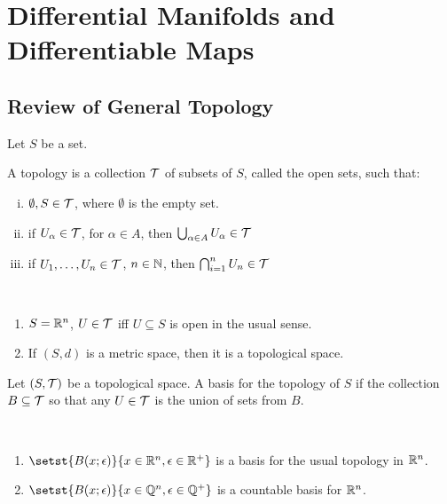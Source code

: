 
\section{Differential Manifolds and Differentiable Maps}
\label{Section1}

\subsection{Review of General Topology}

Let $S$ be a set.

\begin{definition}
	A topology is a collection $\mathcal{T}$ of subsets of $S$, called the open sets, such that:
	\begin{enumerate}[(i)]
		\item $\emptyset, S \in \mathcal{T}$, where $\emptyset$ is the empty set.
		\item if $U_\alpha \in \mathcal{T}$, for $\alpha\in A$, then $\bigcup_{\alpha\in A} U_\alpha \in \mathcal{T}$
		\item if $U_1, \dots, U_n \in \mathcal{T}$, $n \in \mathbb N$, then $\bigcap_{i=1}^n U_n \in \mathcal{T}$  
	\end{enumerate}
\end{definition}

\begin{example}
	~
	\begin{enumerate}[1)]
		\item $ S=\mathbb R^n$, $U \in \mathcal{T}$ iff $U \subseteq S$ is open in the usual sense.
		\item If $(S, d)$ is a metric space, then it is a topological space.
	\end{enumerate}
\end{example}

\begin{definition}
	Let $(S,\mathcal{T})$ be a topological space. A basis for the topology of $S$ if the collection $B \subseteq \mathcal{T}$ so that any $U\in\mathcal{T}$ is the union of sets from $B$.
\end{definition}

\begin{example}
	~
	\begin{enumerate}[1)]
		\item $\setst{B(x;\epsilon)}{ x \in \bbR^n, \epsilon\in\bbR^+}$ is a basis for the usual topology in $\mathbb R^n$.
		\item $\setst{B(x;\epsilon)}{ x \in \bbQ^n, \epsilon\in\bbQ^+}$ is a countable basis for $\mathbb R^n$.
	\end{enumerate}
\end{example}

